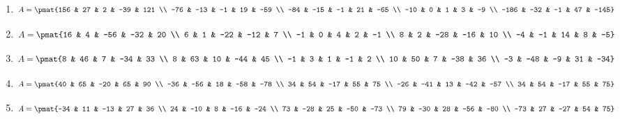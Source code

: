 \begin{enumerate}
\item

\begin{align*}
A = \pmat{156 & 27 & 2 & -39 & 121 \\ -76 & -13 & -1 & 19 & -59 \\ -84 & -15 & -1 & 21 & -65 \\ -10 & 0 & 1 & 3 & -9 \\ -186 & -32 & -1 & 47 & -145}
\end{align*}

\item

\begin{align*}
A = \pmat{16 & 4 & -56 & -32 & 20 \\ 6 & 1 & -22 & -12 & 7 \\ -1 & 0 & 4 & 2 & -1 \\ 8 & 2 & -28 & -16 & 10 \\ -4 & -1 & 14 & 8 & -5}
\end{align*}

\item

\begin{align*}
A = \pmat{8 & 46 & 7 & -34 & 33 \\ 8 & 63 & 10 & -44 & 45 \\ -1 & 3 & 1 & -1 & 2 \\ 10 & 50 & 7 & -38 & 36 \\ -3 & -48 & -9 & 31 & -34}
\end{align*}

\item

\begin{align*}
A = \pmat{40 & 65 & -20 & 65 & 90 \\ -36 & -56 & 18 & -58 & -78 \\ 34 & 54 & -17 & 55 & 75 \\ -26 & -41 & 13 & -42 & -57 \\ 34 & 54 & -17 & 55 & 75}
\end{align*}

\item

\begin{align*}
A = \pmat{-34 & 11 & -13 & 27 & 36 \\ 24 & -10 & 8 & -16 & -24 \\ 73 & -28 & 25 & -50 & -73 \\ 79 & -30 & 28 & -56 & -80 \\ -73 & 27 & -27 & 54 & 75}
\end{align*}


\end{enumerate}
